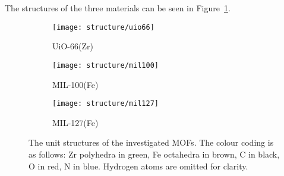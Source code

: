 The structures of the three materials can be seen in Figure~\ref{fig:mofstructures}.

\begin{figure}[t]
    \centering
    \begin{subfigure}{0.3\textwidth}
        \texttt{[image: structure/uio66]}
        \caption{UiO-66(Zr)}
    \end{subfigure}
    \begin{subfigure}{0.3\textwidth}
        \texttt{[image: structure/mil100]}
        \caption{MIL-100(Fe)}
    \end{subfigure}
    \begin{subfigure}{0.3\textwidth}
        \texttt{[image: structure/mil127]}
        \caption{MIL-127(Fe)}
    \end{subfigure}
    
    \caption{The unit structures of the investigated MOFs.
    The colour coding is as follows: Zr polyhedra in green, 
    Fe octahedra in brown, C in black, O in red, N in blue. 
    Hydrogen atoms are omitted for clarity.}
    \label{fig:mofstructures}
\end{figure}